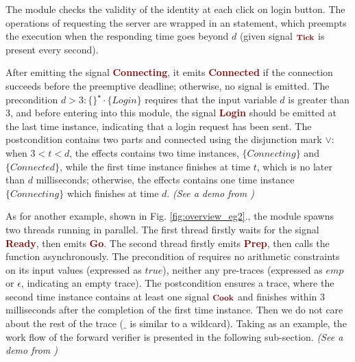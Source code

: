\documentclass[acmsmall,10pt,review]{acmart}
\newcommand{\anyevent}[1]{{\textcolor{darkred}
{{\textbf{\footnotesize #1}}}}}
\newcommand{\code}[1]{{\tt{\ensuremath{\m{#1}}}}}
\newcommand{\m}{\mathit}
\newcommand\figref[1]{Fig. \textcolor{black}{\ref{#1}}.}
\begin{document}
The {} module checks the validity of the identity at each click on login button. The operations of requesting the server are wrapped in an {\textbf{\color{purple}}} statement, which preempts the execution when the responding time goes beyond \code{\m{d}} (given signal \code{\anyevent{Tick}} is present every second).


After emitting the signal \anyevent{Connecting}, it emits  \anyevent{Connected} if the connection succeeds before the  preemptive deadline; otherwise, no signal is emitted. 
The precondition \code{d{>}3 : \{
\}^\star \cdot\{\m{Login}\} } requires that the input variable \code{d} is greater than 3, and before entering into this module, the signal \anyevent{Login} should be emitted at the last time instance, indicating that a login request has been sent. 
The postcondition contains two parts and connected using the disjunction mark \code{{\vee}}: when \code{3{<}t{<}d}, the effects contains two time instances, \code{\{\m{Connecting}\}} and \code{\{\m{Connected}\}}, while the first  time instance finishes at time \code{t}, %
which is no later than \code{\m{d}} milliseconds; otherwise, the effects contains one time instance \code{\{Connecting\}} which finishes at time \code{d}. \emph{(See a demo from \cite{CODE1})}



As for another example, shown in \figref{fig:overview_eg2}, the module {} %
spawns two threads running in  parallel.
The first thread firstly waits for the signal \anyevent{Ready}, then emits  \anyevent{Go}. 
The second thread firstly emits  \anyevent{Prep}, then calls the function {} asynchronously. 
The precondition of {} requires no arithmetic constraints on its input values (expressed as \code{\m{true}}), neither any pre-traces  (expressed as \code{\m{emp}} or \code{\epsilon}, indicating an empty trace). The postcondition ensures a trace, where the second time instance contains at least one signal \code{\anyevent{Cook}} and finishes within 3 milliseconds after the completion of the first time instance. Then we do not care about the rest of the trace (\code{\_} is similar to a wildcard). 
Taking {} as an example, the work flow of the forward verifier is presented in the following sub-section. \emph{(See a demo from \cite{CODE2})}
\end{document}
